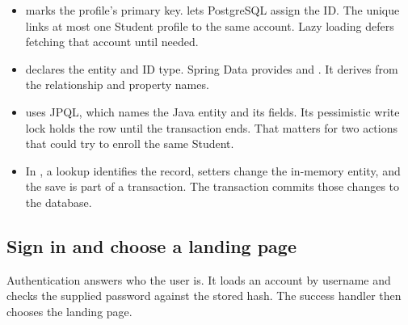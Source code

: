 \begin{itemize}
\item {} marks the profile's primary key.  lets PostgreSQL
assign the ID. The unique  links at most one Student profile to
the same account. Lazy loading defers fetching that account until needed.
\item {} declares the entity and ID type.
Spring Data provides  and . It derives
 from the relationship and property names.
\item {} uses JPQL, which names the Java entity and its
fields. Its pessimistic write lock holds the row until the transaction ends.
That matters for two actions that could try to enroll the same Student.
\item In , a lookup identifies the record, setters change
the in-memory entity, and the save is part of a transaction. The transaction
commits those changes to the database.
\end{itemize}

\clearpage
\subsection{Sign in and choose a landing page}
Authentication answers who the user is. It loads an account by username and
checks the supplied password against the stored hash. The success handler then
chooses the landing page.


